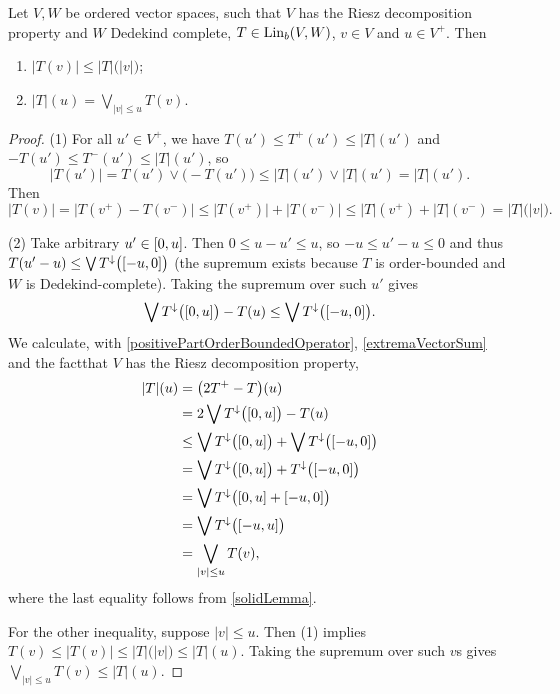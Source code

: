 \begin{lemma} \label{absoluteValueOrderBoundedOperatorLemma}
Let $V,W$ be ordered vector spaces, such that $V$ has the Riesz decomposition property and $W$ Dedekind complete, $T \in \operatorname{Lin}_b(V,W)$, $v\in V$ and $u\in V^+$. Then
\begin{enumerate}
\item $|T(v)| \leq |T|\big(|v|\big)$;
\item $|T|(u) = \bigvee_{|v| \leq u} T(v)$.
\end{enumerate}
\end{lemma}
\begin{proof}
(1) For all $u'\in V^+$, we have $T(u') \leq T^+(u') \leq |T|(u')$ and $-T(u')\leq T^-(u') \leq |T|(u')$, so
\[ |T(u')| = T(u') \vee \big(-T(u')\big) \leq |T|(u')\vee |T|(u') = |T|(u'). \]
Then
\[ |T(v)| = \big|T(v^+) - T(v^-)\big| \leq \big|T(v^+)\big| + \big|T(v^-)\big| \leq |T|(v^+) + |T|(v^-) = |T|\big(|v|\big). \]

(2) Take arbitrary $u'\in \interval{0,u}$. Then $0\leq u - u' \leq u$, so $-u \leq u'-u \leq 0$ and thus $T(u' - u) \leq \bigvee T^{\imf}\big(\interval{-u, 0}\big)$ (the supremum exists because $T$ is order-bounded and $W$ is Dedekind-complete). Taking the supremum over such $u'$ gives
\[ \bigvee T^\imf\big(\interval{0,u}\big) - T(u) \leq \bigvee T^{\imf}\big(\interval{-u,0}\big). \]
We calculate, with \ref{positivePartOrderBoundedOperator}, \ref{extremaVectorSum} and the factthat $V$ has the Riesz decomposition property,
\begin{align*}
|T|(u) &= \big(2T^+ - T\big)(u) \\
&= 2\bigvee T^\imf\big(\interval{0,u}\big) - T(u) \\
&\leq \bigvee T^\imf\big(\interval{0,u}\big) + \bigvee T^\imf\big(\interval{-u, 0}\big) \\
&= \bigvee T^\imf\big(\interval{0,u}\big) + T^\imf\big(\interval{-u, 0}\big) \\
&= \bigvee T^\imf\big(\interval{0,u} + \interval{-u, 0}\big) \\
&= \bigvee T^\imf\big(\interval{-u,u}\big) \\
&= \bigvee_{|v|\leq u}T(v),
\end{align*}
where the last equality follows from \ref{solidLemma}.

For the other inequality, suppose $|v| \leq u$. Then (1) implies $T(v) \leq |T(v)| \leq |T|\big(|v|\big) \leq |T|(u)$. Taking the supremum over such $v$s gives $\bigvee_{|v|\leq u}T(v) \leq |T|(u)$.
\end{proof}


